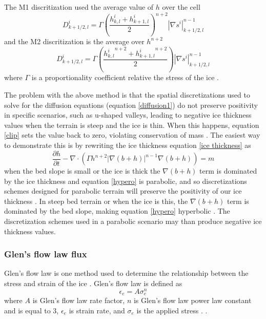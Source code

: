 \documentclass{article}
\begin{document}
The M1 discritization used the average value of $h$ over the cell
\begin{equation}
    D^i_{k+1/2,l}=\Gamma\left(\frac{h^i_{k,l}+h^i_{k+1,l}}{2}\right)^{n+2}|\nabla s ^i|^{n-1}_{k+1/2,l}
\end{equation}
and the M2 discritization is the average over $h^{n+2}$
\begin{equation}
    D^i_{k+1/2,l}=\Gamma\left(\frac{{h^i_{k,l}}^{n+2}+{h^i_{k+1,l}}^{n+2}}{2}\right)|\nabla s ^i|^{n-1}_{k+1/2,l}
\end{equation}
where $\Gamma$ is a proportionality coefficient relative the stress of the ice \citep{Jarosch2013}. 

The problem with the above method is that the spatial discretizations used to solve for the diffusion equations (equation \ref{diffusion1}) do not preserve positivity in specific scenarios, such as u-shaped valleys, leading to negative ice thickness values when the terrain is steep and the ice is thin. When this happens, equation \ref{clip} sets the value back to zero, violating conservation of mass \citep{Jarosch2013, Hindmarsh1996}. The easiest way to demonstrate this is by rewriting the ice thickness equation \ref{ice thickness} as
\begin{equation}\label{hypero}
\frac{\partial h}{\partial t} - \nabla \cdot \left( \Gamma h^{n+2} |\nabla(b+h)|^{n-1}\nabla(b+h)\right) =m
\end{equation}
when the bed slope is small or the ice is thick the  $\nabla(b+h)$ term is dominated by the ice thickness and equation \ref{hypero} is parabolic, and so discretizations schemes designed for parabolic terrain will preserve the positivity of our ice thickness \cite{Jarosch2013}. In steep bed terrain or when the ice is this, the $\nabla(b+h)$ term is dominated by the bed slope, making equation \ref{hypero} hyperbolic \cite{Jarosch2013}. The discretization schemes used in a parabolic scenario may than produce negative ice thickness values.



\subsubsection{Glen's flow law flux}
Glen's flow law is one method used to determine the relationship between the stress and strain of the ice  \citep{AHLKRONA2016}. Glen's flow law is defined as
\begin{equation}\label{Glen}
\epsilon_e = A \sigma^n_e
\end{equation}
where $A$ is Glen’s flow law rate factor, $n$ is Glen’s flow law power law constant and is equal to 3, $\epsilon_e$ is strain rate, and $\sigma_e$ is the applied stress \citep{Hooke2013, Nye1952}. \citep{Jarosch2013, AHLKRONA2016}.
\end{document}
